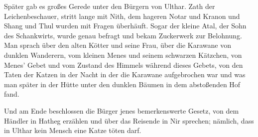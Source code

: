 \documentclass[a4paper]{memoir}
\begin{document}
Später gab es großes Gerede unter den Bürgern von Ulthar. Zath der Leichenbeschauer, stritt lange mit Nith, dem hageren Notar und Kranon und Shang und Thul wurden mit Fragen überhäuft. Sogar der kleine Atal, der Sohn des Schankwirts, wurde genau befragt und bekam Zuckerwerk zur Belohnung. Man sprach über den alten Kötter und seine Frau, über die Karawane von dunklen Wanderern, vom kleinen Menes und seinem schwarzen Kätzchen, von Menes' Gebet und vom Zustand des Himmels während dieses Gebets, von den Taten der Katzen in der Nacht in der die Karawane aufgebrochen war und was man später in der Hütte unter den dunklen Bäumen in dem abstoßenden Hof fand.

Und am Ende beschlossen die Bürger jenes bemerkenswerte Gesetz, von dem Händler in Hatheg erzählen und über das Reisende in Nir sprechen; nämlich, dass in Ulthar kein Mensch eine Katze töten darf.
\end{document}
